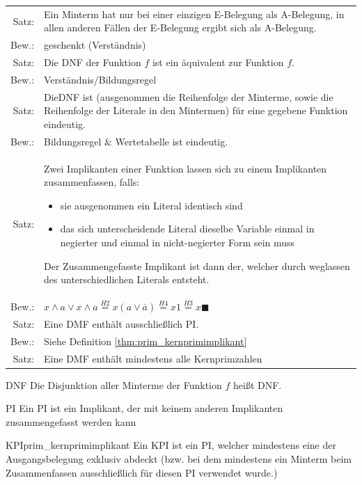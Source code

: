 \documentclass[10pt,a4paper]{scrartcl}
\begin{document}
\begin{table}[h!]
	\centering
	\begin{tabular}{rp{15cm}}
	Satz: & Ein Minterm hat nur bei einer einzigen E-Belegung \glqq 1\grqq{} als A-Belegung, in allen anderen Fällen der E-Belegung ergibt sich \glqq 0\grqq{} als A-Belegung.\\
	Bew.:& geschenkt (Verständnis)\\ \hline
	Satz: & Die \ac{DNF} der Funktion $ f $ ist ein äquivalent zur Funktion $ f $.\\
	Bew.:& Verständnis/Bildungsregel\\ \hline
	Satz: & Die\ac{DNF} ist (ausgenommen die Reihenfolge der Minterme, sowie die Reihenfolge der Literale in den Mintermen) für eine gegebene Funktion eindeutig.\\
	Bew.:& Bildungsregel \& Wertetabelle ist eindeutig.\\ \hline
	Satz: & Zwei Implikanten einer Funktion lassen sich zu einem Implikanten zusammenfassen, falls:
	\begin{itemize}[itemsep=0mm]
		\item sie ausgenommen ein Literal identisch sind
		\item das sich unterscheidende Literal dieselbe Variable einmal in negierter und einmal in nicht-negierter Form sein muss
	\end{itemize}
	Der Zusammengefasste Implikant ist dann der, welcher durch weglassen des unterschiedlichen Literals entsteht. \\
	Bew.:&$ x \wedge a \vee x \wedge a \overset{H2}{=} x(a \vee \overline{a}) \overset{H4}{=} x1 \overset{H3}{=} x \blacksquare$\\ \hline
	Satz: & Eine \ac{DMF} enthält ausschließlich \ac{PI}.\\
	Bew.:&  Siehe Definition \ref{thm:prim_kernprimimplikant} \\ \hline
	Satz: & Eine \ac{DMF} enthält mindestens alle Kernprimzahlen
\end{tabular}
\end{table}

\begin{Theorem}{\acl*{DNF}}{}
	Die Disjunktion aller Minterme der Funktion $ f $ heißt \ac{DNF}.
\end{Theorem}
\begin{Theorem}{\acl*{PI}}{}
Ein \ac{PI} ist ein Implikant, der mit keinem anderen Implikanten zusammengefasst werden kann
\end{Theorem}
\begin{Theorem}{\acl*{KPI}}{prim_kernprimimplikant}
	Ein \ac{KPI} ist ein \ac{PI}, welcher mindestens eine der Ausgangsbelegung exklusiv abdeckt (bzw. bei dem mindestens ein Minterm beim Zusammenfassen ausschließlich für diesen \ac{PI} verwendet wurde.)
\end{Theorem}
\end{document}
